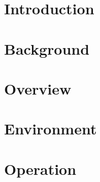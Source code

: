 \documentclass{article}
\title{}
\author{}
\date{}
\begin{document}

    
    \tableofcontents
    \listoffigures

    \newpage
    \begin{versionhistory}
    \end{versionhistory}
    \newpage

    \section{Introduction}

    \section{Background}

    \section{Overview}

    \section{Environment}

    \section{Operation}
\end{document}
